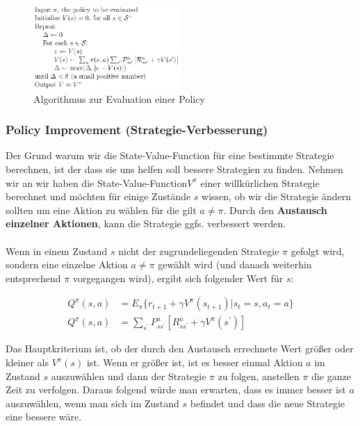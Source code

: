 \documentclass[10pt]{scrartcl}
\begin{document}
\begin{figure}[htbp]
	\centering	\includegraphics[width=0.5\textwidth]{Bilder/Evaluation.png}
	\caption{Algorithmus zur Evaluation einer Policy}
	\label{fig:Evaluation}
\end{figure}

\subsubsection{Policy Improvement (Strategie-Verbesserung)}
Der Grund warum wir die \glqq State-Value-Function\grqq\xspace für eine bestimmte Strategie berechnen, ist der dass sie uns helfen soll bessere Strategien zu finden. Nehmen wir an wir haben die \glqq State-Value-Function\grqq\xspace $V^{\pi}$ einer willkürlichen Strategie berechnet und möchten für einige Zustände $s$ wissen, ob wir die Strategie ändern sollten um eine Aktion zu wählen für die gilt $a \neq \pi$. Durch den \textbf{Austausch einzelner Aktionen}, kann die Strategie ggfs. verbessert werden.\\
\\  
Wenn in einem Zustand $s$ nicht der zugrundeliegenden Strategie $\pi$ gefolgt wird, sondern eine einzelne Aktion $a \neq \pi$ gewählt wird (und danach weiterhin entsprechend $\pi$ vorgegangen wird), ergibt sich folgender Wert für $s$:

\begin{align}
Q^{\pi}(s,a) &= E_{\pi} \{ r_{t+1} + \gamma V^{\pi}(s_{t+1}) | s_{t}=s, a_{t}=a \}\\
Q^{\pi}(s,a) &= \sum_{s^{'}} P^a_{ss^{'}} [R^a_{ss^{'}} + \gamma V^\pi (s^{'})]
\end{align}

Das Hauptkriterium ist, ob der durch den Austausch errechnete Wert größer oder kleiner als $V^{\pi}(s)$ ist. Wenn er größer ist, ist es besser einmal Aktion $a$ im Zustand $s$ auszuwählen und dann der Strategie $\pi$ zu folgen, anstellen $\pi$ die ganze Zeit zu verfolgen. Daraus folgend würde man erwarten, dass es immer besser ist $a$ auszuwählen, wenn man sich im Zustand $s$ befindet und dass die neue Strategie eine bessere wäre.
\end{document}
